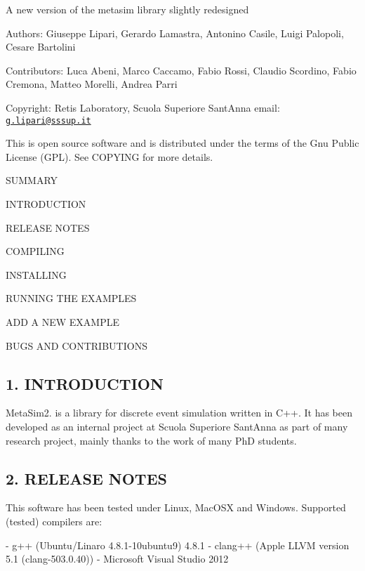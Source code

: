 A new version of the metasim library slightly redesigned

Authors\+: Giuseppe Lipari, Gerardo Lamastra, Antonino Casile, Luigi Palopoli, Cesare Bartolini

Contributors\+: Luca Abeni, Marco Caccamo, Fabio Rossi, Claudio Scordino, Fabio Cremona, Matteo Morelli, Andrea Parri

Copyright\+: Retis Laboratory, Scuola Superiore Sant\textquotesingle{}Anna email\+: \href{mailto:g.lipari@sssup.it}{\tt g.\+lipari@sssup.\+it}

This is open source software and is distributed under the terms of the Gnu Public License (G\+PL). See C\+O\+P\+Y\+I\+NG for more details. 



S\+U\+M\+M\+A\+RY


\begin{DoxyEnumerate}
\item I\+N\+T\+R\+O\+D\+U\+C\+T\+I\+ON
\item R\+E\+L\+E\+A\+SE N\+O\+T\+ES
\item C\+O\+M\+P\+I\+L\+I\+NG
\item I\+N\+S\+T\+A\+L\+L\+I\+NG
\item R\+U\+N\+N\+I\+NG T\+HE E\+X\+A\+M\+P\+L\+ES
\item A\+DD A N\+EW E\+X\+A\+M\+P\+LE
\item B\+U\+GS A\+ND C\+O\+N\+T\+R\+I\+B\+U\+T\+I\+O\+NS 


\end{DoxyEnumerate}

\subsection*{1. I\+N\+T\+R\+O\+D\+U\+C\+T\+I\+ON}

Meta\+Sim2. is a library for discrete event simulation written in C++. It has been developed as an internal project at Scuola Superiore Sant\textquotesingle{}Anna as part of many research project, mainly thanks to the work of many PhD students.

\subsection*{2. R\+E\+L\+E\+A\+SE N\+O\+T\+ES}

This software has been tested under Linux, Mac\+O\+SX and Windows. Supported (tested) compilers are\+: \begin{DoxyVerb}- g++ (Ubuntu/Linaro 4.8.1-10ubuntu9) 4.8.1
- clang++ (Apple LLVM version 5.1 (clang-503.0.40))
- Microsoft Visual Studio 2012    
\end{DoxyVerb}


